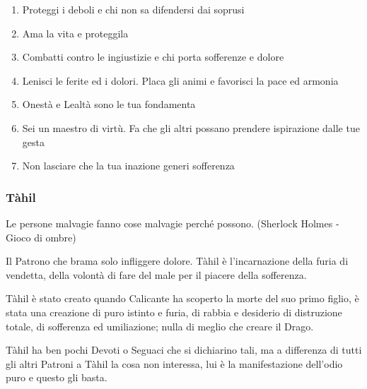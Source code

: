 \begin{multicols}{2}
\begin{enumerate}[leftmargin=*] \setlength{\itemsep}{0pt}
\item Proteggi i deboli e chi non sa difendersi dai soprusi
\item Ama la vita e proteggila
\item Combatti contro le ingiustizie e chi porta sofferenze e dolore
\item Lenisci le ferite ed i dolori. Placa gli animi e favorisci la pace ed armonia
\item Onestà e Lealtà sono le tua fondamenta
\item Sei un maestro di virtù. Fa che gli altri possano prendere ispirazione dalle tue gesta
\item Non lasciare che la tua inazione generi sofferenza
\end{enumerate}

\subsubsection{Tàhil}\label{tahil}\hypertarget{tahil}{}

\begin{changemargin}{0.3cm}{0.3cm}\begin{enfasi}{
Le persone malvagie fanno cose malvagie perché possono. (Sherlock Holmes - Gioco di ombre)
}\end{enfasi}\end{changemargin}

Il Patrono che brama solo infliggere dolore. Tàhil è l'incarnazione della furia di vendetta, della volontà di fare del male per il piacere della sofferenza.

Tàhil è stato creato quando Calicante ha scoperto la morte del suo primo figlio, è stata una creazione di puro istinto e furia, di rabbia e desiderio di distruzione totale, di sofferenza ed umiliazione; nulla di meglio che creare il Drago.

Tàhil ha ben pochi Devoti o Seguaci che si dichiarino tali, ma a differenza di tutti gli altri Patroni a Tàhil la cosa non interessa, lui è la manifestazione dell'odio puro e questo gli basta.


\end{multicols}

